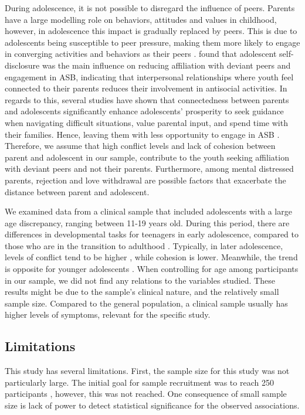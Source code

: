 \documentclass{sn-jnl}                  %
\begin{document}
During adolescence, it is not possible to disregard the influence of peers. Parents have a large modelling role on behaviors, attitudes and values in childhood, however, in adolescence this impact is gradually replaced by peers. This is due to adolescents being susceptible to peer pressure, making them more likely to engage in converging activities and behaviors as their peers \citep{ciranka:2021, steinberg:2004}. \citet{vieno:2009} found that adolescent self-disclosure was the main influence on reducing affiliation with deviant peers and engagement in ASB, indicating that interpersonal relationships where youth feel connected to their parents reduces their involvement in antisocial activities. In regards to this, several studies have shown that connectedness between parents and adolescents significantly enhance adolescents' prosperity to seek guidance when navigating difficult situations, value parental input, and spend time with their families. Hence, leaving them with less opportunity to engage in ASB \citep{ackard:2006, crawford:2008}. Therefore, we assume that high conflict levels and lack of cohesion between parent and adolescent in our sample, contribute to the youth seeking affiliation with deviant peers and not their parents. Furthermore, among mental distressed parents, rejection and love withdrawal are possible factors that exacerbate the distance between parent and adolescent.

We examined data from a clinical sample that included adolescents with a large age discrepancy, ranging between 11-19 years old. During this period, there are differences in developmental tasks for teenagers in early adolescence, compared to those who are in the transition to adulthood \citep{steinberg:2004}. Typically, in later adolescence, levels of conflict tend to be higher \citep{weymouth:2016}, while cohesion is lower. Meanwhile, the trend is opposite for younger adolescents \citep{lin:2019}. When controlling for age among participants in our sample, we did not find any relations to the variables studied. These results might be due to the sample's clinical nature, and the relatively small sample size. Compared to the general population, a clinical sample usually has higher levels of symptoms, relevant for the specific study.

\subsection{Limitations}

This study has several limitations. First, the sample size for this study was not particularly large. The initial goal for sample recruitment was to reach 250 participants \citep{thogersen:2020}, however, this was not reached. One consequence of small sample size is lack of power to detect statistical significance for the observed associations.
\end{document}
